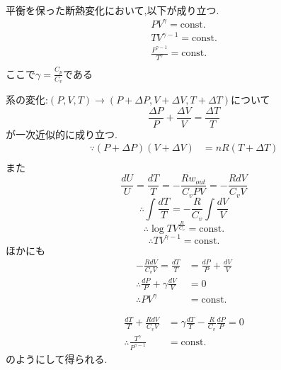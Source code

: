\documentclass[dvipdfmx,uplatex]{jsarticle}
\begin{document}
\begin{theo}[Poissonの法則] \mbox{} \\
平衡を保った断熱変化において,以下が成り立つ.
\begin{align*}
PV^{\gamma} = \mathrm{const.} \\
TV^{\gamma -1} = \mathrm{const.} \\
\frac{P^{\gamma -1}}{T^{\gamma}} = \mathrm{const.} \\
\end{align*}
ここで$\gamma = \frac{C_p}{C_v}$である
\end{theo} 
系の変化:$(P,V,T) \rightarrow (P + \Delta P,V + \Delta V,T + \Delta T)$について
\[
\frac{\Delta P}{P} + \frac{\Delta V}{V} = \frac{\Delta T}{T}
\]
が一次近似的に成り立つ.
\begin{align*}
\because (P + \Delta P)(V + \Delta V) &= nR (T + \Delta T) \\
\end{align*}
また
\[
\frac{dU}{U} = \frac{dT}{T} = - \frac{Rw_{out}}{C_vPV} = -\frac{RdV}{C_vV}
\]
\[
\therefore \int \frac{dT}{T} = - \frac{R}{C_v} \int \frac{dV}{V}
\]
\[
\therefore \log TV^{\frac{R}{C_v}} = \mathrm{const.}
\]
\[
\therefore TV^{\gamma - 1} = \mathrm{const.}
\]
ほかにも
\begin{align*}
 -\frac{RdV}{C_vV} = \frac{dT}{T} &= \frac{d P}{P} + \frac{d V}{V} \\
 \therefore \frac{d P}{P} + \gamma \frac{d V}{V} &= 0 \\
 \therefore PV^{\gamma} &= \mathrm{const.}
\end{align*}

\begin{align*}
 \frac{dT}{T} + \frac{RdV}{C_vV} &= \gamma \frac{dT}{T} - \frac{R}{C_v} \frac{d P}{P} = 0 \\
 \therefore \frac{T^{\gamma}}{P^{\gamma -1}} &= \mathrm{const.}
\end{align*}
のようにして得られる.
\end{document}
